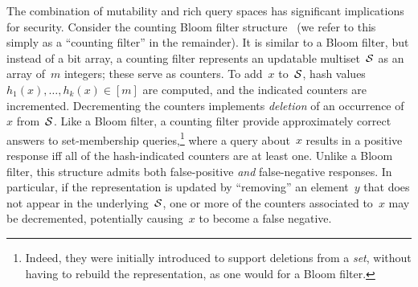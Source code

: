 The combination of mutability and rich query spaces has significant implications
for security. Consider the counting Bloom filter
structure~\cite{fan2000summary} (we refer to this simply as a ``counting
filter'' in the remainder).  It is similar to a Bloom filter, but 
instead of a bit array, a counting filter represents an updatable
multiset~$\mathcal{S}$ as an array of~$m$ integers; these serve as counters.
To add~$x$ to~$\mathcal{S}$, hash values $h_1(x), \ldots,
h_k(x)\in[m]$ are computed, and the indicated counters are
incremented.  Decrementing the counters implements \emph{deletion} of
an occurrence of~$x$ from~$\mathcal{S}$. %
%
Like a Bloom filter, a counting filter provide approximately correct
answers to set-membership queries,\footnote{Indeed, they were initially
introduced to support deletions from a \emph{set}, without having to
rebuild the representation, as one would for a Bloom filter.} where a
query about~$x$ results in a positive response iff all of the
hash-indicated counters are at least one.
%
%
%
Unlike a Bloom filter, this structure admits both false-positive \emph{and} false-negative responses.
In particular, if the representation is updated by ``removing'' an element~$y$
that does not appear in the underlying~$\mathcal{S}$, one or more of the counters
associated to~$x$ may be decremented, potentially causing~$x$ to become a false
negative.


